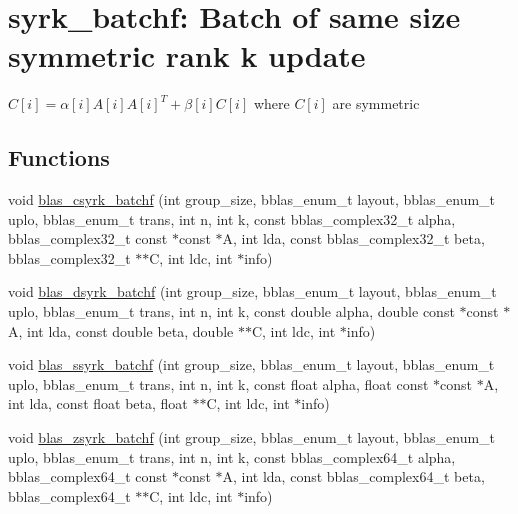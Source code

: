 \hypertarget{group__syrk__batchf}{}\section{syrk\+\_\+batchf\+: Batch of same size symmetric rank k update}
\label{group__syrk__batchf}


$ C[i] = \alpha[i] A[i] A[i]^T + \beta[i] C[i] $ where $ C[i] $ are symmetric  


\subsection*{Functions}
\begin{DoxyCompactItemize}
\item 
void \hyperlink{group__syrk__batchf_ga9febfef5913e417a169253881b64e423}{blas\+\_\+csyrk\+\_\+batchf} (int group\+\_\+size, bblas\+\_\+enum\+\_\+t layout, bblas\+\_\+enum\+\_\+t uplo, bblas\+\_\+enum\+\_\+t trans, int n, int k, const bblas\+\_\+complex32\+\_\+t alpha, bblas\+\_\+complex32\+\_\+t const $\ast$const $\ast$A, int lda, const bblas\+\_\+complex32\+\_\+t beta, bblas\+\_\+complex32\+\_\+t $\ast$$\ast$C, int ldc, int $\ast$info)
\item 
void \hyperlink{group__syrk__batchf_gaf7aebb3698636b020b8c6b5a09715011}{blas\+\_\+dsyrk\+\_\+batchf} (int group\+\_\+size, bblas\+\_\+enum\+\_\+t layout, bblas\+\_\+enum\+\_\+t uplo, bblas\+\_\+enum\+\_\+t trans, int n, int k, const double alpha, double const $\ast$const $\ast$A, int lda, const double beta, double $\ast$$\ast$C, int ldc, int $\ast$info)
\item 
void \hyperlink{group__syrk__batchf_ga1406866a70d2f1b721b114c517f503dd}{blas\+\_\+ssyrk\+\_\+batchf} (int group\+\_\+size, bblas\+\_\+enum\+\_\+t layout, bblas\+\_\+enum\+\_\+t uplo, bblas\+\_\+enum\+\_\+t trans, int n, int k, const float alpha, float const $\ast$const $\ast$A, int lda, const float beta, float $\ast$$\ast$C, int ldc, int $\ast$info)
\item 
void \hyperlink{group__syrk__batchf_gaeec75ae41dc2d56a6de96e5407d83ad2}{blas\+\_\+zsyrk\+\_\+batchf} (int group\+\_\+size, bblas\+\_\+enum\+\_\+t layout, bblas\+\_\+enum\+\_\+t uplo, bblas\+\_\+enum\+\_\+t trans, int n, int k, const bblas\+\_\+complex64\+\_\+t alpha, bblas\+\_\+complex64\+\_\+t const $\ast$const $\ast$A, int lda, const bblas\+\_\+complex64\+\_\+t beta, bblas\+\_\+complex64\+\_\+t $\ast$$\ast$C, int ldc, int $\ast$info)
\end{DoxyCompactItemize}


